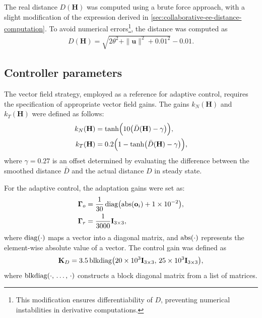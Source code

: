 The real distance $D(\mathbf{H})$ was computed using a brute force approach, with a slight modification of the expression derived in \cref{sec:collaborative-ee-distance-computation}. To avoid numerical errors\footnote{This modification ensures differentiability of $D$, preventing numerical instabilities in derivative computations.}, the distance was computed as
\begin{align}
    D(\mathbf{H}) = \sqrt{2\theta^2 + \|\mathbf{u}\|^2 + 0.01^2} - 0.01.
\end{align}

\subsection{Controller parameters}
The vector field strategy, employed as a reference for adaptive control, requires the specification of appropriate vector field gains. The gains $k_N(\mathbf{H})$ and $k_T(\mathbf{H})$ were defined as follows:
\begin{align}
    k_N(\mathbf{H}) &= \tanh\Bigl(10\bigl(\bar{D}(\mathbf{H})- \gamma\bigr)\Bigr),\\
    k_T(\mathbf{H}) &= 0.2\Bigl(1 - \tanh\bigl(\bar{D}(\mathbf{H}) - \gamma\bigr)\Bigr),
\end{align}
where $\gamma=0.27$ is an offset determined by evaluating the difference between the smoothed distance $\bar{D}$ and the actual distance $D$ in steady state.

For the adaptive control, the adaptation gains were set as:
\begin{align}
    \boldsymbol{\Gamma}_o &= \frac{1}{30}\operatorname{diag}\bigl(\operatorname{abs}(\mathbf{o}_i) + \num{1E-2}\bigr),\\
    \boldsymbol{\Gamma}_r &= \frac{1}{3000}\mathbf{I}_{3\times3},
\end{align}
where $\operatorname{diag}(\cdot)$ maps a vector into a diagonal matrix, and $\operatorname{abs}(\cdot)$ represents the element-wise absolute value of a vector. The control gain was defined as
\begin{align}
    \mathbf{K}_D = 3.5\operatorname{blkdiag}\bigl(\num{20E3}\mathbf{I}_{3\times3},\, \num{25E3}\mathbf{I}_{3\times3}\bigr),
\end{align}
where $\operatorname{blkdiag}(\cdot,\, \dots,\, \cdot)$ constructs a block diagonal matrix from a list of matrices.
